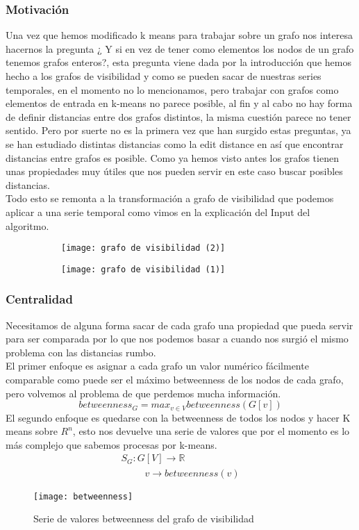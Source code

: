\documentclass[12pt,a4paper]{article}
\begin{document}
			\subsubsection{Motivación}
			Una vez que hemos modificado k means para trabajar sobre un grafo nos interesa hacernos la pregunta ¿ Y si en vez de tener como elementos los nodos de un grafo tenemos grafos enteros?, esta pregunta viene dada por la introducción que hemos hecho a los grafos de visibilidad y como se pueden sacar de nuestras series temporales, en el momento no lo mencionamos, pero trabajar con grafos como elementos de entrada en k-means no parece posible, al fin y al cabo no hay forma de definir distancias entre dos grafos distintos, la misma cuestión parece no tener sentido. Pero por suerte no es la primera vez que han surgido estas preguntas, ya se han estudiado distintas distancias como la edit distance en \cite{DistGrafo} así que encontrar distancias entre grafos es posible. Como ya hemos visto antes los grafos tienen unas propiedades muy útiles que nos pueden servir en este caso buscar posibles distancias.\\
		Todo esto se remonta a la transformación a grafo de visibilidad que podemos aplicar a una serie temporal como vimos en la explicación del Input del algoritmo.	
\begin{figure}[H]
\centering
\begin{subfigure}{.5\textwidth}
  \centering
  \texttt{[image: grafo de visibilidad (2)]}
  \label{fig:sub1}
\end{subfigure}%
\begin{subfigure}{.5\textwidth}
  \centering
  \texttt{[image: grafo de visibilidad (1)]}
  \label{fig:sub2}
\end{subfigure}
\end{figure}
			
			\subsubsection{Centralidad}
			Necesitamos de alguna forma sacar de cada grafo una propiedad que pueda servir para ser comparada por lo que nos podemos basar a cuando nos surgió el mismo problema con las distancias rumbo. \\
			El primer enfoque es asignar a cada grafo un valor numérico fácilmente comparable como puede ser el máximo betweenness de los nodos de cada grafo, pero volvemos al problema de que perdemos mucha información.\\
			\[betweenness_G =max_{v\in V} betweenness(G[v]) \]
			El segundo enfoque es quedarse con la betweenness de todos los nodos y hacer K means sobre $R^n$, esto nos devuelve una serie de valores que por el momento es lo más complejo que sabemos procesas por k-means.\\
			\[\begin{array}{lcc}
S_G:G[V] \rightarrow \mathbb{R}\\
 \ \ \ \ \ \ \ \ \ \ \ v \rightarrow betweenness(v)
\end{array}\]
\begin{figure}[H]
\centering
  \texttt{[image: betweenness]}
  \caption{Serie de valores betweenness del grafo de visibilidad}
\end{figure}
\end{document}
